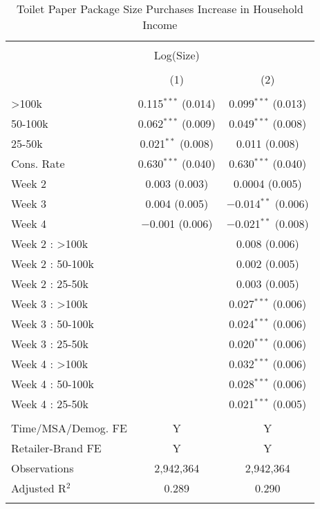 
\begin{table}[!htbp] \centering 
  \caption{Toilet Paper Package Size Purchases Increase in Household Income} 
  \label{tab:packageSizeFullWeekLiquidity} 
\begin{tabular}{@{\extracolsep{5pt}}lcc} 
\\[-1.8ex]\hline 
\hline \\[-1.8ex] 
 & Log(Size) &  \\ 
\\[-1.8ex] & (1) & (2)\\ 
\hline \\[-1.8ex] 
 >100k & 0.115$^{***}$ (0.014) & 0.099$^{***}$ (0.013) \\ 
  50-100k & 0.062$^{***}$ (0.009) & 0.049$^{***}$ (0.008) \\ 
  25-50k & 0.021$^{**}$ (0.008) & 0.011 (0.008) \\ 
  Cons. Rate & 0.630$^{***}$ (0.040) & 0.630$^{***}$ (0.040) \\ 
  Week 2 & 0.003 (0.003) & 0.0004 (0.005) \\ 
  Week 3 & 0.004 (0.005) & $-$0.014$^{**}$ (0.006) \\ 
  Week 4 & $-$0.001 (0.006) & $-$0.021$^{**}$ (0.008) \\ 
  Week 2 : >100k &  & 0.008 (0.006) \\ 
  Week 2 : 50-100k &  & 0.002 (0.005) \\ 
  Week 2 : 25-50k &  & 0.003 (0.005) \\ 
  Week 3 : >100k &  & 0.027$^{***}$ (0.006) \\ 
  Week 3 : 50-100k &  & 0.024$^{***}$ (0.006) \\ 
  Week 3 : 25-50k &  & 0.020$^{***}$ (0.006) \\ 
  Week 4 : >100k &  & 0.032$^{***}$ (0.006) \\ 
  Week 4 : 50-100k &  & 0.028$^{***}$ (0.006) \\ 
  Week 4 : 25-50k &  & 0.021$^{***}$ (0.005) \\ 
 \hline \\[-1.8ex] 
Time/MSA/Demog. FE & Y & Y \\ 
Retailer-Brand FE & Y & Y \\ 
Observations & 2,942,364 & 2,942,364 \\ 
Adjusted R$^{2}$ & 0.289 & 0.290 \\ 
\hline 
\hline \\[-1.8ex] 

\end{tabular}
\end{table}
